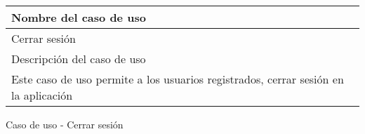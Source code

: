 \begin{identificacionCasoDeUso}
	\begin{tabular} { | p{17cm} |}

		\hline
		Nombre del caso de uso                                                              \\ \hline
		Cerrar sesión                                                                       \\ \hline
		Descripción del caso de uso                                                         \\ \hline
		Este caso de uso permite a los usuarios registrados, cerrar sesión en la aplicación \\ \hline
	\end{tabular}
	\caption{Caso de uso - Cerrar sesión}
\end{identificacionCasoDeUso}